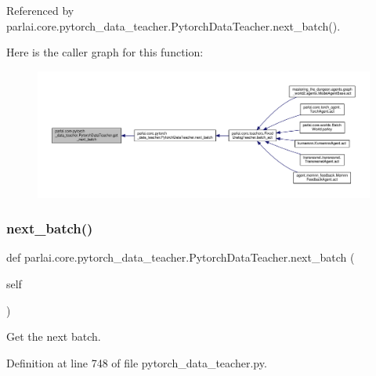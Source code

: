 Referenced by parlai.\+core.\+pytorch\+\_\+data\+\_\+teacher.\+Pytorch\+Data\+Teacher.\+next\+\_\+batch().

Here is the caller graph for this function\+:
\nopagebreak
\begin{figure}[H]
\begin{center}
\leavevmode
\includegraphics[width=350pt]{classparlai_1_1core_1_1pytorch__data__teacher_1_1PytorchDataTeacher_a6bf71f580e9be5b517897260f76178c4_icgraph}
\end{center}
\end{figure}
\mbox{\label{classparlai_1_1core_1_1pytorch__data__teacher_1_1PytorchDataTeacher_aa4e63cd7dd1a904a8424a096f7ca1f63}} 
\subsubsection{\texorpdfstring{next\+\_\+batch()}{next\_batch()}}
{\footnotesize\ttfamily def parlai.\+core.\+pytorch\+\_\+data\+\_\+teacher.\+Pytorch\+Data\+Teacher.\+next\+\_\+batch (\begin{DoxyParamCaption}\item[{}]{self }\end{DoxyParamCaption})}

\begin{DoxyVerb}Get the next batch.\end{DoxyVerb}
 

Definition at line 748 of file pytorch\+\_\+data\+\_\+teacher.\+py.



